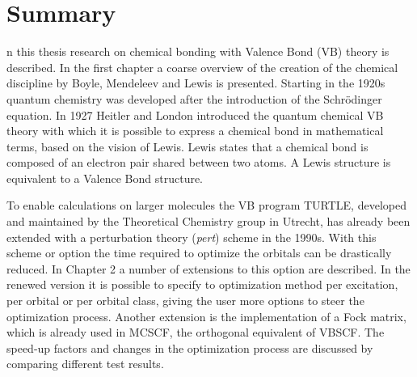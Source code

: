 \chapter*{Summary}
\label{summary}
\fancyhead[RO]{\thepage}
\fancyhead[LE]{\thepage}

\lettrine{}{}n this thesis research on chemical bonding with Valence Bond (VB) theory is described. In the first chapter a coarse overview of the creation of the chemical discipline by Boyle, Mendeleev and Lewis is presented. Starting in the 1920s quantum chemistry was developed after the introduction of the Schr\"{o}dinger equation. In 1927 Heitler and London introduced the quantum chemical VB theory with which it is possible to express a chemical bond in mathematical terms, based on the vision of Lewis. Lewis states that a chemical bond is composed of an electron pair shared between two atoms. A Lewis structure is equivalent to a Valence Bond structure. 

To enable calculations on larger molecules the VB program TURTLE, developed and maintained by the Theoretical Chemistry group in Utrecht, has already been extended with a perturbation theory (\textit{pert}) scheme in the 1990s. With this scheme or option the time required to optimize the orbitals can be drastically reduced. In Chapter 2 a number of extensions to this option are described. In the renewed version it is possible to specify to optimization method per excitation, per orbital or per orbital class, giving the user more options to steer the optimization process. Another extension is the implementation of a Fock matrix, which is already used in MCSCF, the orthogonal equivalent of VBSCF. The speed-up factors and changes in the optimization process are discussed by comparing different test results. 


